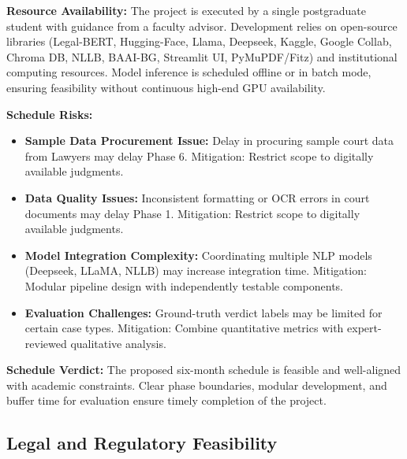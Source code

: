 \textbf{Resource Availability:}
The project is executed by a single postgraduate student with guidance from a faculty advisor. Development relies on open-source libraries (Legal-BERT, Hugging-Face, Llama, Deepseek, Kaggle, Google Collab, Chroma DB, NLLB, BAAI-BG, Streamlit UI, PyMuPDF/Fitz) and institutional computing resources. Model inference is scheduled offline or in batch mode, ensuring feasibility without continuous high-end GPU availability.

\textbf{Schedule Risks:}
\begin{itemize}
	\item \textbf{Sample Data Procurement Issue:} Delay in procuring sample court data from Lawyers may delay Phase 6. 
	Mitigation: Restrict scope to digitally available judgments.
	\item \textbf{Data Quality Issues:} Inconsistent formatting or OCR errors in court documents may delay Phase 1. Mitigation: Restrict scope to digitally available judgments.
	\item \textbf{Model Integration Complexity:} Coordinating multiple NLP models (Deepseek, LLaMA, NLLB) may increase integration time. Mitigation: Modular pipeline design with independently testable components.
	\item \textbf{Evaluation Challenges:} Ground-truth verdict labels may be limited for certain case types. Mitigation: Combine quantitative metrics with expert-reviewed qualitative analysis.
\end{itemize}

\textbf{Schedule Verdict:}
The proposed six-month schedule is feasible and well-aligned with academic constraints. Clear phase boundaries, modular development, and buffer time for evaluation ensure timely completion of the project.






\subsection{Legal and Regulatory Feasibility}


